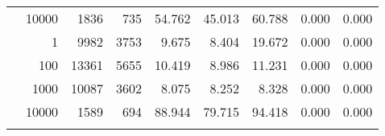 \begin{table}
\begin{tabular}{rrrrrrrrr}
	            
					 &  
					 
					\multirow{ 1 }{*}{ 10000 } &
					
						
							    
							     1836  & 735  
	                           & 54.762 & 45.013 & 60.788
	                           & 0.000 & 0.000  \\
	                
	            
	        
				\noalign{\smallskip}\hline
				\multirow{ 4 }{*}{ 500000 } &
				
					
					 
					\multirow{ 1 }{*}{ 1 } &
					
						
							    
							     9982  & 3753  
	                           & 9.675 & 8.404 & 19.672
	                           & 0.000 & 0.000  \\
	                
	            
					 &  
					 
					\multirow{ 1 }{*}{ 100 } &
					
						
							    
							     13361  & 5655  
	                           & 10.419 & 8.986 & 11.231
	                           & 0.000 & 0.000  \\
	                
	            
					 &  
					 
					\multirow{ 1 }{*}{ 1000 } &
					
						
							    
							     10087  & 3602  
	                           & 8.075 & 8.252 & 8.328
	                           & 0.000 & 0.000  \\
	                
	            
					 &  
					 
					\multirow{ 1 }{*}{ 10000 } &
					
						
							    
							     1589  & 694  
	                           & 88.944 & 79.715 & 94.418
	                           & 0.000 & 0.000  \\
	                
	            
	        
				\noalign{\smallskip}\hline
				\multirow{ 4 }{*}{ 1000000 } &
				

\end{tabular}
\end{table}
